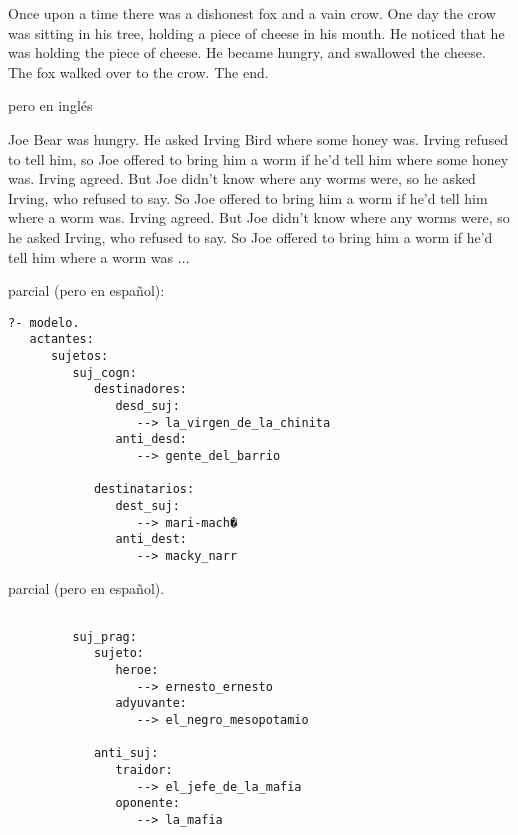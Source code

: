 \documentclass[10pt]{article}
\begin{document}
\begin{huge}
Once upon a time there was a dishonest fox and a vain crow. One day the
crow was sitting in his tree, holding a piece of cheese in his mouth. He
noticed that he was holding the piece of cheese. He became hungry, and
swallowed the cheese. The fox walked over to the crow. The end.


pero en ingl{\'e}s

Joe Bear was hungry. He asked Irving Bird where some honey was.
Irving refused to tell him, so Joe offered to bring him a worm if
he'd tell him where some honey was.  Irving agreed. But Joe didn't
know where any worms were, so he asked Irving, who refused to say.
So Joe offered to bring him a worm if he'd tell him where a worm
was.  Irving agreed. But Joe didn't know where any worms were, so
he asked Irving, who refused to say. So Joe offered to bring him a
worm if he'd tell him where a worm was $\ldots$


 parcial (pero en espa{\~n}ol):

\begin{verbatim}
?- modelo.
   actantes:
      sujetos:
         suj_cogn:
            destinadores:
               desd_suj:
                  --> la_virgen_de_la_chinita
               anti_desd:
                  --> gente_del_barrio

            destinatarios:
               dest_suj:
                  --> mari-mach�
               anti_dest:
                  --> macky_narr
\end{verbatim}


 parcial (pero en espa{\~n}ol).

\begin{verbatim}

         suj_prag:
            sujeto:
               heroe:
                  --> ernesto_ernesto
               adyuvante:
                  --> el_negro_mesopotamio

            anti_suj:
               traidor:
                  --> el_jefe_de_la_mafia
               oponente:
                  --> la_mafia
\end{verbatim}


\end{huge}
\end{document}

